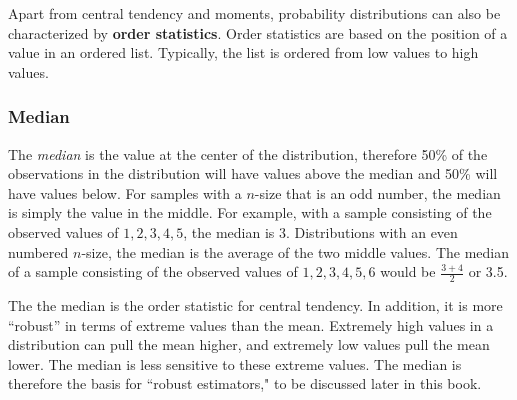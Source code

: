 \documentclass[11pt,openany]{book}
\begin{document}
{Apart from central tendency and moments, probability distributions can also be characterized by \textbf{order statistics}. Order statistics are based on the position of a value in an ordered list. Typically, the list is ordered from low values to high values.


\begin{grbox}
\end{grbox}

\subsubsection{Median}

The \textit{median} is the value at the center of the distribution, therefore 50\% of the observations in the distribution will have values above
the median and 50\% will have values below. For samples with a $n$-size that is an odd number, the median is simply the value in the middle. For example, with a sample consisting of the observed values of $1, 2, 3, 4, 5$, the median is $3$. Distributions with an even numbered $n$-size, the median is the average of the two middle values. The median of a sample consisting of the observed values of $1, 2, 3, 4, 5, 6$
would be $\frac{3+4}{2}$ or 3.5. 

The the median is the order statistic for central tendency. In addition, it is more ``robust'' in terms of extreme values than the mean. Extremely high values in a distribution can pull the mean higher, and extremely low values pull the mean lower. The median is less sensitive to these extreme values. The median is therefore the basis for ``robust estimators," to be discussed later in this book.

}
\end{document}

